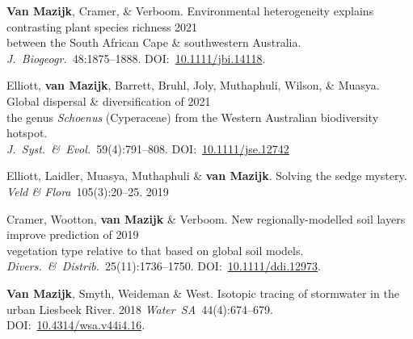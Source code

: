 \begin{hangparas}{2em}{1}

\textbf{Van Mazijk}, Cramer, \& Verboom.
Environmental heterogeneity explains contrasting plant species richness \hfill 2021 \\
\hspace{2em} between the South African Cape \& southwestern Australia. \\
\hspace{2em} \textit{J.~Biogeogr.}~48:1875--1888.
DOI:~\href{https://doi.org/10.1111/jbi.14118}{10.1111/jbi.14118}.

Elliott, \textbf{van Mazijk}, Barrett, Bruhl,
Joly, Muthaphuli, Wilson, \& Muasya.
Global dispersal \& diversification of                            \hfill 2021 \\
  \hspace{2em} the genus \textit{Schoenus} (Cyperaceae)
  from the Western Australian biodiversity hotspot. \\
\hspace{2em} \textit{J.~Syst.~\&~Evol.}~59(4):791--808.
DOI:~\href{https://doi.org/10.1111/jse.1274}{10.1111/jse.12742}

Elliott, Laidler, Muasya, Muthaphuli \& \textbf{van Mazijk}.
Solving the sedge mystery.
\textit{Veld \& Flora}~105(3):20--25. \hfill 2019

Cramer, Wootton, \textbf{van Mazijk} \& Verboom.
New regionally-modelled soil layers improve prediction of               \hfill 2019 \\
\hspace{2em} vegetation type
  relative to that based on global soil models. \\
\hspace{2em} \textit{Divers.~\&~Distrib.}~25(11):1736--1750.
DOI:~\href{https://doi.org/10.1111/ddi.12973}{10.1111/ddi.12973}.

\textbf{Van Mazijk}, Smyth, Weideman \& West.
Isotopic tracing of stormwater in the urban Liesbeek River.             \hfill 2018
\textit{Water~SA}~44(4):674--679.
DOI:~\href{https://doi.org/10.4314/wsa.v44i4.16}{10.4314/wsa.v44i4.16}.

\end{hangparas}
